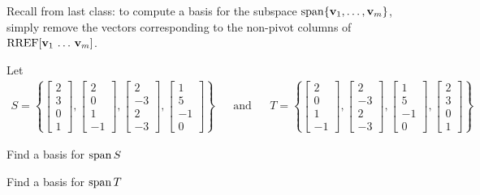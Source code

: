 


\begin{applicationActivities}

\begin{observation}
  Recall from last class: to compute a basis for the subspace \(\operatorname{span}\{\mathbf v_1,\dots,\mathbf v_m\}\),
  simply remove the vectors corresponding to the non-pivot columns of
  \(\operatorname{RREF}[\mathbf v_1\,\dots\,\mathbf v_m]\).
\end{observation}

\begin{activity}{10}
  Let 
  \begin{align*}
  S=\left\{
  \begin{bmatrix}2\\3\\0\\1\end{bmatrix},
  \begin{bmatrix}2\\0\\1\\-1\end{bmatrix},
  \begin{bmatrix}2\\-3\\2\\-3\end{bmatrix},
  \begin{bmatrix}1\\5\\-1\\0\end{bmatrix}
  \right\} & & \text{and}  & &
  T=\left\{
  \begin{bmatrix}2\\0\\1\\-1\end{bmatrix},
  \begin{bmatrix}2\\-3\\2\\-3\end{bmatrix},
  \begin{bmatrix}1\\5\\-1\\0\end{bmatrix},
  \begin{bmatrix}2\\3\\0\\1\end{bmatrix}
  \right\}
  \end{align*}
  \begin{subactivity}
  Find a basis for \(\operatorname{span} S\)
  \end{subactivity}
  \begin{subactivity}
  Find a basis for \(\operatorname{span} T\)
  \end{subactivity}
\end{activity}



\end{applicationActivities}
